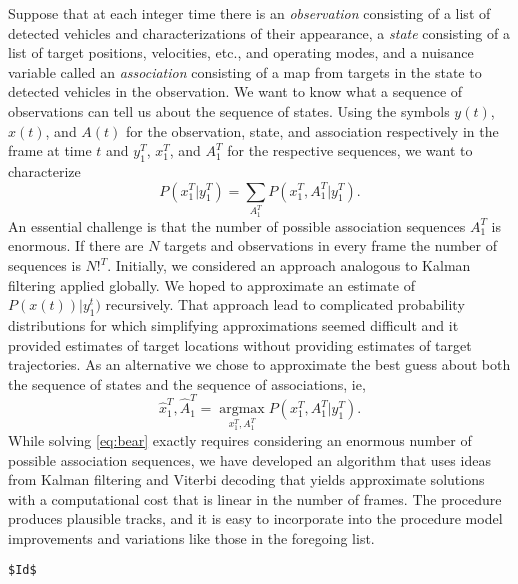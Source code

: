 \documentclass[]{article}
\newcommand{\ti}[2]{{#1}{(#2)}}                         %
\newcommand{\ts}[3]{{#1}_{#2}^{#3}} %
\newcommand{\argmax}{\operatorname*{argmax}}
\begin{document}
Suppose that at each integer time there is an \emph{observation}
consisting of a list of detected vehicles and characterizations of
their appearance, a \emph{state} consisting of a list of target
positions, velocities, etc., and operating modes, and a nuisance
variable called an \emph{association} consisting of a map from targets
in the state to detected vehicles in the observation.  We want to know
what a sequence of observations can tell us about the sequence of
states.  Using the symbols $\ti{y}{t}$, $\ti{x}{t}$, and $\ti{A}{t}$
for the observation, state, and association respectively in the frame
at time $t$ and $\ts{y}{1}{T}$, $\ts{x}{1}{T}$, and $\ts{A}{1}{T}$ for
the respective sequences, we want to characterize
\begin{equation*}
  P(\ts{x}{1}{T}|\ts{y}{1}{T}) = \sum_{\ts{A}{1}{T}}  P(\ts{x}{1}{T},
  \ts{A}{1}{T}|\ts{y}{1}{T}).
\end{equation*}
An essential challenge is that the number of possible association
sequences $\ts{A}{1}{T}$ is enormous.  If there are $N$ targets and
observations in every frame the number of sequences is $N!^T$.
Initially, we considered an approach analogous to Kalman filtering
applied globally.  We hoped to approximate an estimate of
$P(\ti{x}{t})|\ts{y}{1}{t})$ recursively.  That approach lead to
complicated probability distributions for which simplifying
approximations seemed difficult and it provided estimates of target
locations without providing estimates of target trajectories.  As an
alternative we chose to approximate the best guess about both the
sequence of states and the sequence of associations, ie,
\begin{equation}
  \label{eq:bear}
  \ts{{\hat x}}{1}{T},\ts{{\hat A}}{1}{T} =
  \argmax_{\ts{x}{1}{T},\ts{A}{1}{T}}   P(\ts{x}{1}{T},
  \ts{A}{1}{T}|\ts{y}{1}{T}).
\end{equation}
While solving \eqref{eq:bear} exactly requires considering an enormous
number of possible association sequences, we have developed an
algorithm that uses ideas from Kalman filtering and Viterbi decoding
that yields approximate solutions with a computational cost that is
linear in the number of frames.  The procedure produces plausible
tracks, and it is easy to incorporate into the procedure model
improvements and variations like those in the foregoing list.

\begin{verbatim}
$Id$
\end{verbatim}
\end{document}
